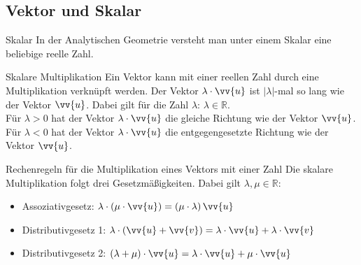 \subsection{Vektor und Skalar}
\begin{merke}{Skalar}{}
   In der Analytischen Geometrie versteht man unter einem Skalar eine beliebige reelle Zahl. 
\end{merke}
\begin{defi}{Skalare Multiplikation}{}
Ein Vektor kann mit einer reellen Zahl durch eine Multiplikation verknüpft werden. Der Vektor $\lambda \cdot \vv{u}$ ist $|\lambda|$-mal so lang wie der Vektor $\vv{u}$. Dabei gilt für die Zahl $\lambda$: $\lambda \in \mathds{R}$.\\
Für $\lambda > 0$ hat der Vektor $\lambda \cdot \vv{u}$ die gleiche Richtung wie der Vektor $\vv{u}$.\\
Für $\lambda < 0$ hat der Vektor $\lambda \cdot \vv{u}$ die entgegengesetzte Richtung wie der Vektor  $\vv{u}$.\\
\begin{center}
\end{center}
\end{defi}
\begin{satz}{Rechenregeln für die Multiplikation eines Vektors mit einer Zahl}{}
Die skalare Multiplikation folgt drei Gesetzmäßigkeiten. Dabei gilt $\lambda, \mu \in \mathds{R}$:
\begin{itemize}
    \item Assoziativgesetz: $\lambda \cdot \left(\mu \cdot \vv{u}\right) =\left( \mu \cdot \lambda \right)\vv{u}$
    \item Distributivgesetz 1: $\lambda \cdot \left(\vv{u} + \vv{v}\right) =\lambda \cdot \vv{u} + \lambda \cdot \vv{v} $
    \item Distributivgesetz 2: $\left( \lambda + \mu\right) \cdot \vv{u} =\lambda \cdot \vv{u} + \mu \cdot \vv{u}  $
\end{itemize}
\end{satz}
